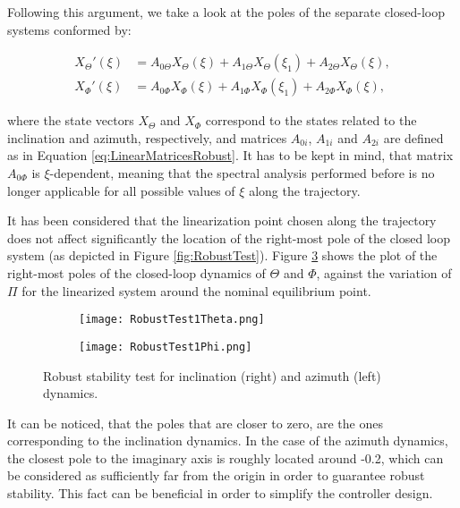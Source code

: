\documentclass[../main.tex]{subfiles}
\begin{document}
Following this argument, we take a look at the poles of the separate closed-loop systems conformed by:

\begin{align}
	X_\Theta'(\xi) &= A_{0\Theta} X_\Theta(\xi) + A_{1\Theta} X_\Theta(\xi_1) + A_{2\Theta} X_\Theta (\xi), \label{eq:SystemInclination}\\
	X_\Phi'(\xi) &= A_{0\Phi} X_\Phi(\xi) + A_{1\Phi} X_\Phi(\xi_1) + A_{2\Phi} X_\Phi (\xi),
\end{align}

where the state vectors $X_\Theta$ and $X_\Phi$ correspond to the states related to the inclination and azimuth, respectively, and matrices $A_{0i}$, $A_{1i}$ and $A_{2i}$ are defined as in Equation \eqref{eq:LinearMatricesRobust}. It has to be kept in mind, that matrix $A_{0\Phi}$ is $\xi$-dependent, meaning that the spectral analysis performed before is no longer applicable for all possible values of $\xi$ along the trajectory. 

It has been considered that the linearization point chosen along the trajectory does not affect significantly the location of the right-most pole of the closed loop system (as depicted in Figure \ref{fig:RobustTest}). Figure \ref{fig:RobustTestIndividual} shows the plot of the right-most poles of the closed-loop dynamics of $\Theta$ and $\Phi$, against the variation of $\Pi$ for the linearized system around the nominal equilibrium point.

 \begin{figure}[ht]
 	\centering
 	\begin{subfigure}[b]{0.45\textwidth}
 		\texttt{[image: RobustTest1Theta.png]}
 		\label{fig:RobustTest1Theta}
 	\end{subfigure}
 	\begin{subfigure}[b]{0.45\textwidth}
 		\texttt{[image: RobustTest1Phi.png]}
 		\label{fig:RobustTest1Phi}
 	\end{subfigure}
 	\caption{\label{fig:RobustTestIndividual}Robust stability test for inclination (right) and azimuth (left) dynamics.}
 \end{figure} 

It can be noticed, that the poles that are closer to zero, are the ones corresponding to the inclination dynamics. In the case of the azimuth dynamics, the closest pole to the imaginary axis is roughly located around -0.2, which can be considered as sufficiently far from the origin in order to guarantee robust stability. This fact can be beneficial in order to simplify the controller design. 
\end{document}
